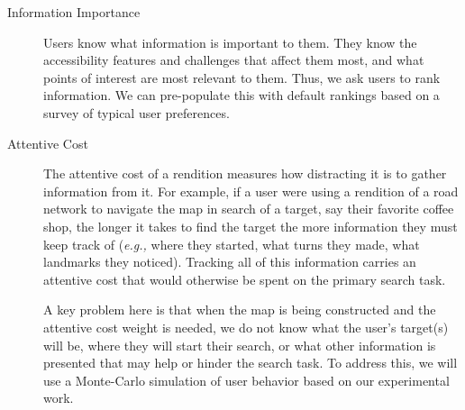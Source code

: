 \begin{description}
\item[Information Importance]
Users know what information is important to them. They know the accessibility features and challenges that affect them most, and what points of interest are most relevant to them. %
Thus, we ask users to rank information. %
We can pre-populate this with default rankings based on a survey of typical user preferences. 

\item[Attentive Cost]
The attentive cost of a rendition measures how distracting it is to gather information from it. For example, if a user were using a rendition of a road network to navigate the map in search of a target, say their favorite coffee shop,  the longer it takes to find the target the more information they must keep track of (\textit{e.g.,} where they started, what turns they made, what landmarks they noticed). Tracking all of this information carries an attentive cost that would otherwise be spent on the primary search task.

A key problem here is that when the map is being constructed and the attentive cost weight is needed, we do not know what the user's target(s) will be, where they will start their search, or what other information is presented that may help or hinder the search task. To address this, we will use a Monte-Carlo simulation of user behavior based on our experimental work. %


\end{description}
